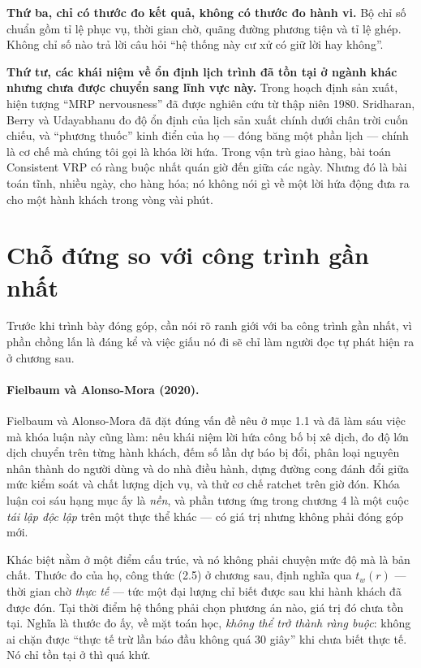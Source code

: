 \textbf{Thứ ba, chỉ có thước đo kết quả, không có thước đo hành vi.} Bộ chỉ số chuẩn gồm tỉ lệ
phục vụ, thời gian chờ, quãng đường phương tiện và tỉ lệ ghép. Không chỉ số nào trả lời câu hỏi
``hệ thống này cư xử có giữ lời hay không''.

\textbf{Thứ tư, các khái niệm về ổn định lịch trình đã tồn tại ở ngành khác nhưng chưa được
chuyển sang lĩnh vực này.} Trong hoạch định sản xuất, hiện tượng ``MRP nervousness'' đã được
nghiên cứu từ thập niên 1980. Sridharan, Berry và Udayabhanu \cite{sridharan1987} đo độ ổn định
của lịch sản xuất chính dưới chân trời cuốn chiếu, và ``phương thuốc'' kinh điển của họ ---
đóng băng một phần lịch --- chính là cơ chế mà chúng tôi gọi là khóa lời hứa. Trong vận trù
giao hàng, bài toán Consistent VRP \cite{kovacs2014} có ràng buộc nhất quán giờ đến giữa các
ngày. Nhưng đó là bài toán tĩnh, nhiều ngày, cho hàng hóa; nó không nói gì về một lời hứa động
đưa ra cho một hành khách trong vòng vài phút.

\section{Chỗ đứng so với công trình gần nhất}
\label{muc:chodung}

Trước khi trình bày đóng góp, cần nói rõ ranh giới với ba công trình gần nhất, vì phần chồng lấn
là đáng kể và việc giấu nó đi sẽ chỉ làm người đọc tự phát hiện ra ở chương sau.

\paragraph{Fielbaum và Alonso-Mora (2020).} Fielbaum và Alonso-Mora \cite{fielbaum2020} đã đặt
đúng vấn đề nêu ở mục 1.1 và đã làm sáu việc
mà khóa luận này cũng làm: nêu khái niệm lời hứa công bố bị xê dịch, đo độ lớn dịch chuyển trên
từng hành khách, đếm số lần dự báo bị đổi, phân loại nguyên nhân thành do người dùng và do nhà
điều hành, dựng đường cong đánh đổi giữa mức kiểm soát và chất lượng dịch vụ, và thử cơ chế
ratchet trên giờ đón. Khóa luận coi sáu hạng mục ấy là \emph{nền}, và phần tương ứng trong
chương 4 là một cuộc \emph{tái lập độc lập} trên một thực thể khác --- có giá trị nhưng không
phải đóng góp mới.

Khác biệt nằm ở một điểm cấu trúc, và nó không phải chuyện mức độ mà là bản chất. Thước đo của
họ, công thức (2.5) ở chương sau, định nghĩa qua $t_w(r)$ --- thời gian chờ \emph{thực tế} ---
tức một đại lượng chỉ biết được sau khi hành khách đã được đón. Tại thời điểm hệ thống phải
chọn phương án nào, giá trị đó chưa tồn tại. Nghĩa là thước đo ấy, về mặt toán học, \emph{không
thể trở thành ràng buộc}: không ai chặn được ``thực tế trừ lần báo đầu không quá 30 giây'' khi
chưa biết thực tế. Nó chỉ tồn tại ở thì quá khứ.

